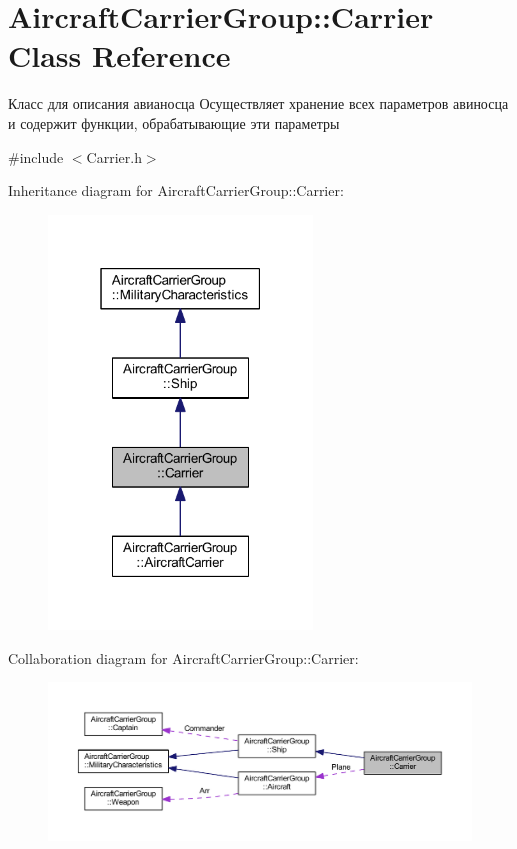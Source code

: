 \hypertarget{class_aircraft_carrier_group_1_1_carrier}{}\section{Aircraft\+Carrier\+Group\+:\+:Carrier Class Reference}
\label{class_aircraft_carrier_group_1_1_carrier}


Класс для описания авианосца  Осуществляет хранение всех параметров авиносца и содержит функции, обрабатывающие эти параметры  




{\ttfamily \#include $<$Carrier.\+h$>$}



Inheritance diagram for Aircraft\+Carrier\+Group\+:\+:Carrier\+:
\nopagebreak
\begin{figure}[H]
\begin{center}
\leavevmode
\includegraphics[width=199pt]{class_aircraft_carrier_group_1_1_carrier__inherit__graph}
\end{center}
\end{figure}


Collaboration diagram for Aircraft\+Carrier\+Group\+:\+:Carrier\+:
\nopagebreak
\begin{figure}[H]
\begin{center}
\leavevmode
\includegraphics[width=350pt]{class_aircraft_carrier_group_1_1_carrier__coll__graph}
\end{center}
\end{figure}

